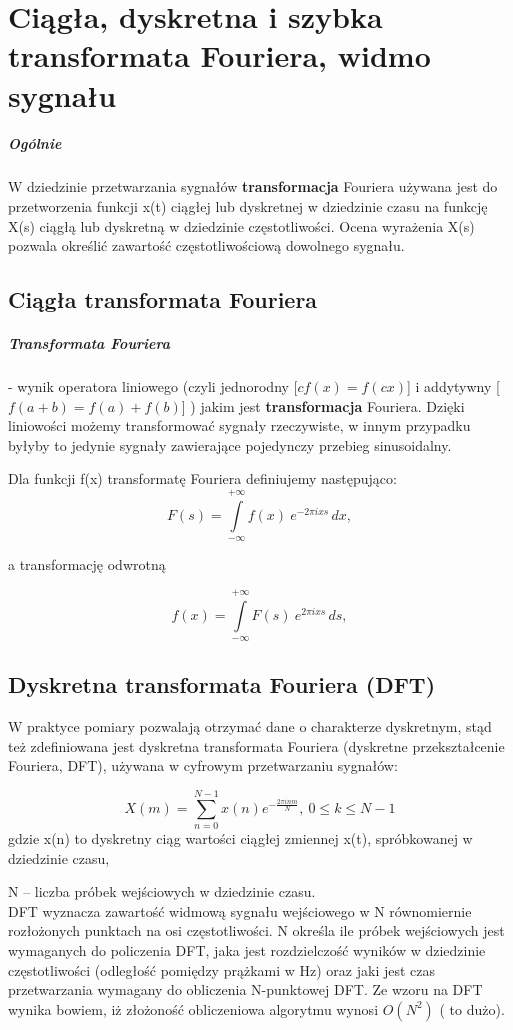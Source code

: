 \documentclass[a4paper,twoside]{report}
\begin{document}
\chapter{Ciągła, dyskretna i szybka transformata Fouriera, widmo sygnału}
\paragraph{Ogólnie}
W dziedzinie przetwarzania sygnałów \textbf{transformacja} Fouriera używana jest do przetworzenia funkcji x(t) ciągłej lub dyskretnej w dziedzinie czasu na funkcję X(s) ciągłą lub dyskretną w dziedzinie częstotliwości. Ocena wyrażenia X(s) pozwala określić zawartość częstotliwościową dowolnego sygnału. 

\section{Ciągła transformata Fouriera}
\paragraph{Transformata Fouriera}
- wynik operatora liniowego (czyli jednorodny [$ cf(x) = f(cx) $] i addytywny [$ f(a+b)=f(a)+f(b) $] ) jakim jest \textbf{transformacja} Fouriera. Dzięki liniowości możemy transformować sygnały rzeczywiste, w innym przypadku byłyby to jedynie sygnały zawierające pojedynczy przebieg sinusoidalny.

Dla funkcji f(x) transformatę Fouriera definiujemy następująco:
$$ F(s) = \int\limits_{-\infty}^{+\infty} f(x)\ e^{- 2\pi i x s}\,dx, $$

a transformację odwrotną

$$ f(x) = \int\limits_{-\infty}^{+\infty} F(s)\ e^{2\pi i x s}\,ds, $$

\section{Dyskretna transformata Fouriera (DFT)}
W praktyce pomiary pozwalają otrzymać dane o charakterze dyskretnym, stąd też zdefiniowana jest dyskretna transformata Fouriera (dyskretne przekształcenie Fouriera, DFT), używana w cyfrowym przetwarzaniu sygnałów:

$$ X(m)= \sum_{n=0}^{N-1}{x(n) e^{- \frac{2 \pi i n m}{N}}} , \ 0 \le k \le N-1 $$
gdzie x(n) to dyskretny ciąg wartości ciągłej zmiennej x(t), spróbkowanej w dziedzinie czasu, 

N – liczba próbek wejściowych w dziedzinie czasu. \\
DFT wyznacza zawartość widmową sygnału wejściowego w N równomiernie rozłożonych punktach na osi częstotliwości. N określa ile próbek wejściowych jest wymaganych do policzenia DFT, jaka jest rozdzielczość wyników w dziedzinie częstotliwości (odległość pomiędzy prążkami w Hz) oraz jaki jest czas przetwarzania wymagany do obliczenia N-punktowej DFT. Ze wzoru na DFT wynika bowiem, iż złożoność obliczeniowa algorytmu wynosi $ O(N^2) $ ( to dużo).
\end{document}
